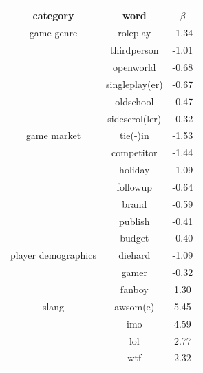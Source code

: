 \documentclass[letterpaper]{article}
\begin{document}
\begin{table}[tb]
\centering
\begin{tabular}{|c|cc|}
\hline \textbf{category} & \textbf{word} & $\beta$ \\ 

\hline  game genre 
& roleplay & -1.34 \\
& thirdperson & -1.01 \\
& openworld & -0.68 \\
& singleplay(er) & -0.67 \\
& oldschool & -0.47 \\
& sidescrol(ler) & -0.32 \\ 

\hline game market 
& tie(-)in & -1.53 \\
& competitor & -1.44 \\ 
& holiday & -1.09 \\ 
& followup & -0.64 \\ 
& brand & -0.59 \\ 
& publish & -0.41 \\ 
& budget & -0.40 \\ 


\hline player demographics 
& diehard & -1.09 \\ 
& gamer & -0.32 \\ 
& fanboy & 1.30 \\ 

\hline slang 
& awsom(e) & 5.45 \\ 
& imo & 4.59 \\ 
& lol & 2.77 \\ 
& wtf & 2.32 \\ 


\end{tabular}
\end{table}
\end{document}
